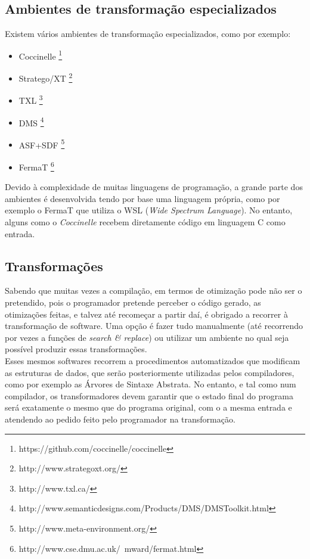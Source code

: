 \documentclass[runningheads,a4paper]{llncs}
\begin{document}
\begin{multicols}{2}
\section{Ambientes de transformação especializados}
Existem vários ambientes de transformação especializados, como por exemplo:
\begin{itemize}
	\item Coccinelle \footnote{https://github.com/coccinelle/coccinelle}
	\item Stratego/XT \footnote{http://www.strategoxt.org/}
	\item TXL \footnote{http://www.txl.ca/}
	\item DMS \footnote{http://www.semanticdesigns.com/Products/DMS/DMSToolkit.html}
	\item ASF+SDF \footnote{http://www.meta-environment.org/}
	\item FermaT \footnote{http://www.cse.dmu.ac.uk/~mward/fermat.html}
\end{itemize}
Devido à complexidade de muitas linguagens de programação, a grande parte dos ambientes é desenvolvida tendo por base uma linguagem própria, como por exemplo o FermaT que utiliza o WSL (\emph{Wide Spectrum Language}). No entanto, alguns como o \emph{Coccinelle} recebem diretamente código em linguagem C como entrada.
\subsection{Transformações}
Sabendo que muitas vezes a compilação, em termos de otimização pode não ser o pretendido, pois o programador pretende perceber o código gerado, as otimizações feitas, e talvez até recomeçar a partir daí, é obrigado a recorrer à transformação de software. Uma opção é fazer tudo manualmente (até recorrendo por vezes a funções de \emph{search \& replace}) ou utilizar um ambiente no qual seja possível produzir essas transformações.\\
Esses mesmos softwares recorrem a procedimentos automatizados que modificam as estruturas de dados, que serão posteriormente utilizadas pelos compiladores, como por exemplo as Árvores de Sintaxe Abstrata. No entanto, e tal como num compilador, os transformadores devem garantir que o estado final do programa será exatamente o mesmo que do programa original, com o a mesma entrada e atendendo ao pedido feito pelo programador na transformação.\\

\end{multicols}
\end{document}
